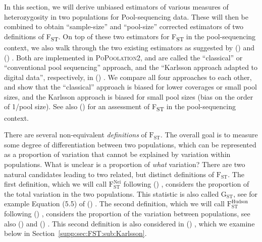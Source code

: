 \documentclass[a4paper,fontsize=9pt,DIV=14]{scrartcl}
\newcommand\citeay[1]{\citeauthor{#1} (\citeyear{#1}) \cite{#1}}
\newcommand\toolname{\textsc}
\newcommand\secref[1]{Section~\ref{#1}}
\newcommand{\fst}{F\textsubscript{ST}}
\begin{document}
In this section, we will derive unbiased estimators of various measures of heterozygosity in two populations for Pool-sequencing data.
These will then be combined to obtain ``sample-size'' and ``pool-size'' corrected estimators of two definitions of \fst.
On top of these two estimators for \fst{} in the pool-sequencing context, we also walk through the two existing estimators as suggested by \citeay{Kofler2011b} and \citeay{Karlsson2007}.
Both are implemented in \toolname{PoPoolation2}, and are called the ``classical'' or ``conventional pool sequencing'' approach, and the ``Karlsson approach adapted to digital data'', respectively, in \citeay{Kofler2011b}.
We compare all four approaches to each other, and show that the ``classical'' approach is biased for lower coverages or small pool sizes, and the Karlsson approach is biased for small pool sizes (bias on the order of 1/pool size).
See also \citeay{Hivert2018} for an assessment of \fst{} in the pool-sequencing context.


\label{supp:sec:FST:sub:Definition}

There are several non-equivalent \emph{definitions} of $\text{F}_\text{ST}$.
The overall goal is to measure some degree of differentiation between two populations, which can be represented as a proportion of variation that cannot be explained by variation within populations.
What is unclear is a proportion of \emph{what} variation?
There are two natural candidates leading to two related, but distinct definitions of $\text{F}_\text{ST}$.
The first definition, which we will call $\text{F}_\text{ST}^\text{Nei}$ following \citeay{Nei1973}, considers the proportion of the total variation in the two populations.
This statistic is also called $\text{G}_\text{ST}$, see for example Equation (5.5) of \citeay{Hahn2018}.
The second definition, which we will call $\text{F}_\text{ST}^\text{Hudson}$ following \citeay{Hudson1992}, considers the proportion of the variation between populations, see also \citeay{Cockerham1969} and \citeay{Weir2002}.
This second definition is also considered in \citeay{Karlsson2007}, which we examine below in \secref{supp:sec:FST:sub:Karlsson}.
\end{document}
